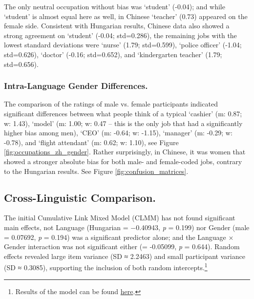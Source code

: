 \documentclass[runningheads]{llncs}
\newcommand{\zh}[1]{\simplifiedchinesefont{#1}\rmfamily}
\begin{document}
The only neutral occupation without bias was \zh{学生} `student' (-0.04); and while `student' is almost equal here as well, in Chinese \zh{教师} `teacher' (0.73) appeared on the female side. 
Consistent with Hungarian results, Chinese data also showed a strong agreement on \zh{学生} `student' (-0.04; std=0.286), the remaining jobs with the lowest standard deviations were \zh{护士} `nurse' (1.79; std=0.599), \zh{警察} `police officer' (-1.04; std=0.626), \zh{医生} `doctor' (-0.16; std=0.652), and \zh{幼师} `kindergarten teacher' (1.79; std=0.656).

\subsubsection{Intra-Language Gender Differences.}

The comparison of the ratings of male vs. female participants indicated significant differences between what people think of a typical \zh{收银员} `cashier' (m: 0.87; w: 1.43), \zh{模特} `model' (m: 1.00; w: 0.47 -- this is the only job that had a significantly higher bias among men), \zh{董事长} `CEO' (m: -0.64; w: -1.15), \zh{高管} `manager' (m: -0.29; w: -0.78), and \zh{乘务员} `flight attendant' (m: 0.62; w: 1.10), see Figure \ref{fig:occupations_zh_gender}.
Rather surprisingly, in Chinese, it was women that showed a stronger absolute bias for both male- and female-coded jobs, contrary to the Hungarian results. See Figure \ref{fig:confusion_matrices}.


\subsection{Cross-Linguistic Comparison.}


The initial Cumulative Link Mixed Model (CLMM) has not found significant main effects, not Language (Hungarian \beta = −0.40943, \textit{p} = 0.199) nor Gender (male \beta = 0.07692, \textit{p} = 0.194) was a significant predictor alone; and the Language × Gender interaction was not significant either (\beta = -0.05099, \textit{p} = 0.644). Random effects revealed large item variance (SD ≈ 2.2463) and small participant variance (SD ≈ 0.3085), supporting the inclusion of both random intercepts.\footnote{Results of the model can be found \href{https://github.com/partigabor/occupational-gender-bias/blob/main/clmm_results.txt}{here}.}
\end{document}
